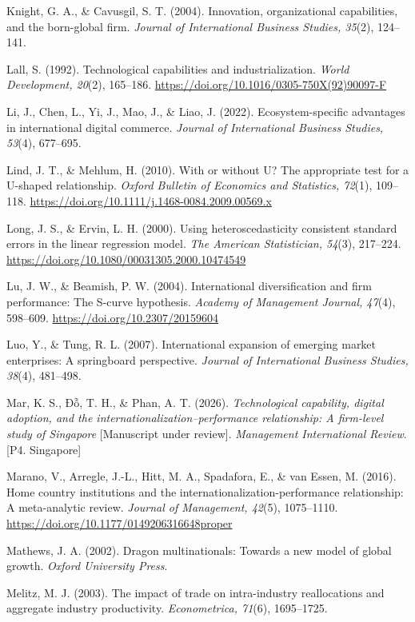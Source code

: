 \documentclass[12pt,a4paper]{article}
\begin{document}
Knight, G. A., \& Cavusgil, S. T. (2004). Innovation, organizational
capabilities, and the born-global firm. \emph{Journal of International
Business Studies, 35}(2), 124--141.

Lall, S. (1992). Technological capabilities and industrialization.
\emph{World Development, 20}(2), 165--186.
\url{https://doi.org/10.1016/0305-750X(92)90097-F}

Li, J., Chen, L., Yi, J., Mao, J., \& Liao, J. (2022).
Ecosystem-specific advantages in international digital commerce.
\emph{Journal of International Business Studies, 53}(4), 677--695.

Lind, J. T., \& Mehlum, H. (2010). With or without U? The appropriate
test for a U-shaped relationship. \emph{Oxford Bulletin of Economics and
Statistics, 72}(1), 109--118.
\url{https://doi.org/10.1111/j.1468-0084.2009.00569.x}

Long, J. S., \& Ervin, L. H. (2000). Using heteroscedasticity consistent
standard errors in the linear regression model. \emph{The American
Statistician, 54}(3), 217--224.
\url{https://doi.org/10.1080/00031305.2000.10474549}

Lu, J. W., \& Beamish, P. W. (2004). International diversification and
firm performance: The S-curve hypothesis. \emph{Academy of Management
Journal, 47}(4), 598--609. \url{https://doi.org/10.2307/20159604}

Luo, Y., \& Tung, R. L. (2007). International expansion of emerging
market enterprises: A springboard perspective. \emph{Journal of
International Business Studies, 38}(4), 481--498.

Mar, K. S., Đỗ, T. H., \& Phan, A. T. (2026). \emph{Technological
capability, digital adoption, and the internationalization--performance
relationship: A firm-level study of Singapore} {[}Manuscript under
review{]}. \emph{Management International Review}. {[}P4. Singapore{]}

Marano, V., Arregle, J.-L., Hitt, M. A., Spadafora, E., \& van Essen, M.
(2016). Home country institutions and the
internationalization-performance relationship: A meta-analytic review.
\emph{Journal of Management, 42}(5), 1075--1110.
\url{https://doi.org/10.1177/0149206316648proper}

Mathews, J. A. (2002). Dragon multinationals: Towards a new model of
global growth. \emph{Oxford University Press}.

Melitz, M. J. (2003). The impact of trade on intra-industry
reallocations and aggregate industry productivity. \emph{Econometrica,
71}(6), 1695--1725.
\end{document}
